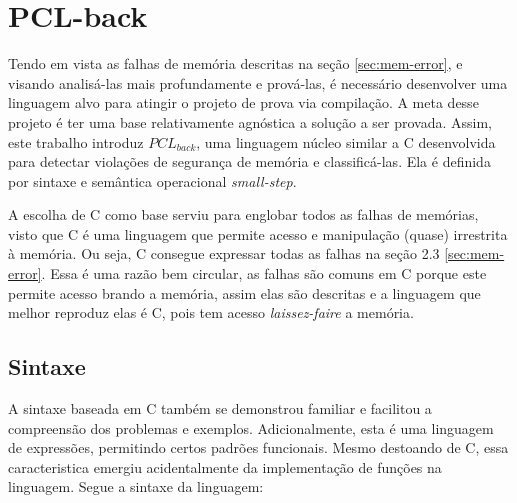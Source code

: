 \chapter{PCL-back}


Tendo em vista as falhas de memória descritas na seção \ref{sec:mem-error}, e visando analisá-las mais profundamente e prová-las, é necessário desenvolver uma linguagem alvo para atingir o projeto de prova via compilação. A meta desse projeto é ter uma base relativamente agnóstica a solução a ser provada. Assim, este trabalho introduz $PCL_{back}$, uma linguagem núcleo similar a C desenvolvida para detectar violações de segurança de memória e classificá-las. Ela é definida por sintaxe e semântica operacional \emph{small-step}. 

A escolha de C como base serviu para englobar todos as falhas de memórias, visto que C é uma linguagem que permite acesso e manipulação (quase) irrestrita à memória. Ou seja, C consegue expressar todas as falhas na seção 2.3 \ref{sec:mem-error}. Essa é uma razão bem circular, as falhas são comuns em C porque este permite acesso brando a memória, assim elas são descritas e a linguagem que melhor reproduz elas é C, pois tem acesso \emph{laissez-faire} a memória.

\section{Sintaxe}

A sintaxe baseada em C também se demonstrou familiar e facilitou a compreensão dos problemas e exemplos. Adicionalmente, esta é uma linguagem de expressões, permitindo certos padrões funcionais. Mesmo destoando de C, essa caracteristica emergiu acidentalmente da implementação de funções na linguagem. Segue a sintaxe da linguagem:

